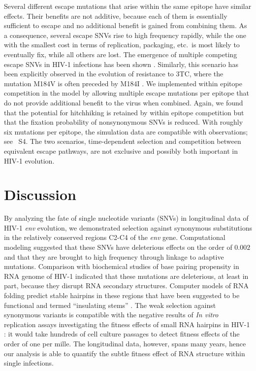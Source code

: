 \documentclass[rmp, twocolumn]{revtex4}
\newcommand{\env}{\textit{env}}
\newcommand{\withinepi}{4}
\begin{document}
Several different escape mutations that arise within the 
same epitope have similar effects. Their benefits
are not additive, because each of them is essentially sufficient to escape and
no additional benefit is gained from combining them. As a consequence, several
escape SNVs rise to high frequency rapidly, while the one with the smallest cost
in terms of replication, packaging, etc.~is most likely to eventually fix, while
all others are lost. The emergence of multiple competing escape SNVs in HIV-1
infections has been shown \citep{moore_limited_2009, bar_early_2012}. 
Similarly, this scenario has been explicitly observed in the evolution of
resistance to 3TC, where the mutation M184V is often preceded by M184I
\citep{hedskog_dynamics_2010}. We implemented within epitope competition 
in the model by allowing multiple escape mutations per epitope that do
not provide additional benefit to the virus when combined. Again, we found that the potential for
hitchhiking is retained by within epitope competition but that the
fixation probability of nonsynonymous SNVs is reduced. With roughly six
mutations per epitope, the simulation data are compatible with observations; see
\figurename~S\withinepi. The two scenarios, time-dependent selection and
competition between equivalent escape pathways, are not exclusive and possibly
both important in HIV-1 evolution.

\section{Discussion}
By analyzing the fate of single nucleotide variants (SNVs) in
longitudinal data of HIV-1 \env{} evolution, we demonstrated selection
against synonymous substitutions in the relatively conserved regions
C2-C4 of the \env{} gene. Computational modeling suggested that these
SNVs have deleterious effects on the order of $0.002$ and that they are
brought to high frequency through linkage to adaptive mutations.
Comparison with biochemical studies of base pairing propensity in RNA
genome of HIV-1 indicated that these mutations are deleterious, at least
in part, because they disrupt RNA secondary structures. Computer models
of RNA folding predict stable hairpins in these regions that
have been suggested to be functional and termed ``insulating
stems'' \citep{watts_architecture_2009, sanjuan_interplay_2011}.
The weak selection against synonymous variants is compatible with the
negative results of \textit{In vitro} replication assays investigating
the fitness effects of small RNA hairpins in HIV-1
\citep{knoepfel_role_2013}: it would take hundreds of cell culture
passages to detect fitness effects of the order of one per mille. The longitudinal data,
however, spans many years, hence our analysis is able to quantify the
subtle fitness effect of RNA structure within single infections.
\end{document}

